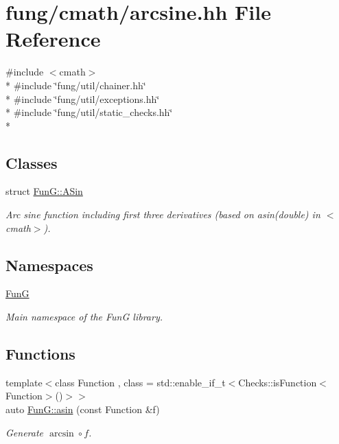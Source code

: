 \hypertarget{arcsine_8hh}{\section{fung/cmath/arcsine.hh File Reference}
\label{arcsine_8hh}
}
{\ttfamily \#include $<$cmath$>$}\\*
{\ttfamily \#include \char`\"{}fung/util/chainer.\-hh\char`\"{}}\\*
{\ttfamily \#include \char`\"{}fung/util/exceptions.\-hh\char`\"{}}\\*
{\ttfamily \#include \char`\"{}fung/util/static\-\_\-checks.\-hh\char`\"{}}\\*
\subsection*{Classes}
\begin{DoxyCompactItemize}
\item 
struct \hyperlink{structFunG_1_1ASin}{Fun\-G\-::\-A\-Sin}
\begin{DoxyCompactList}\small\item\em Arc sine function including first three derivatives (based on asin(double) in $<$cmath$>$). \end{DoxyCompactList}\end{DoxyCompactItemize}
\subsection*{Namespaces}
\begin{DoxyCompactItemize}
\item 
\hyperlink{namespaceFunG}{Fun\-G}
\begin{DoxyCompactList}\small\item\em Main namespace of the Fun\-G library. \end{DoxyCompactList}\end{DoxyCompactItemize}
\subsection*{Functions}
\begin{DoxyCompactItemize}
\item 
{\footnotesize template$<$class Function , class  = std\-::enable\-\_\-if\-\_\-t$<$\-Checks\-::is\-Function$<$\-Function$>$()$>$$>$ }\\auto \hyperlink{group__CMathGroup_gad26443b289325876cffdaadfca770d51}{Fun\-G\-::asin} (const Function \&f)
\begin{DoxyCompactList}\small\item\em Generate $ \arcsin\circ f $. \end{DoxyCompactList}\end{DoxyCompactItemize}
